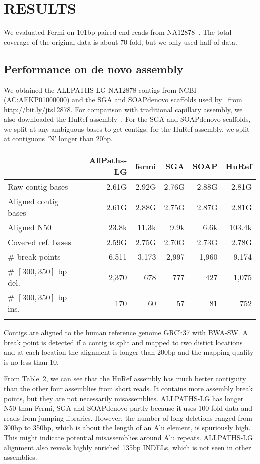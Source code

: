 \documentclass{bioinfo}
\begin{document}
\section{RESULTS}

We evaluated Fermi on 101bp paired-end reads from NA12878~\citep{Depristo:2011vn}.
The total coverage of the original data is about 70-fold, but we only used half
of data.

\subsection{Performance on de novo assembly}
We obtained the ALLPATHS-LG NA12878 contigs from NCBI (AC:AEKP01000000) and
the SGA and SOAPdenovo scaffolds used by~\citet{Simpson:2011ly} from
\mbox{http://bit.ly/jts12878}. For comparison with traditional capillary
assembly, we also downloaded the HuRef assembly~\citep{Levy:2007uq}. For the
SGA and SOAPdenovo scaffolds, we split at any ambiguous bases to get contigs;
for the HuRef assembly, we split at contiguous 'N' longer than 20bp.

\begin{table}[!htb]
{\begin{tabular}{lrrrrr}
\toprule
& AllPaths-LG & fermi & SGA & SOAP & HuRef \\
\midrule
Raw contig bases & 2.61G & 2.92G & 2.76G & 2.88G & 2.81G \\
Aligned contig bases & 2.61G & 2.88G & 2.75G & 2.87G & 2.81G \\
Aligned N50 & 23.8k & 11.3k & 9.9k & 6.6k & 103.4k \\
Covered ref. bases & 2.59G & 2.75G & 2.70G & 2.73G & 2.78G \\
\# break points & 6,511 & 3,173 & 2,997 & 1,960 & 9,174 \\
\# $[300,350]$ bp del. & 2,370 & 678 & 777 & 427 & 1,075 \\
\# $[300,350]$ bp ins. & 170 & 60 & 57 & 81 & 752 \\
\botrule
\end{tabular}}{Contigs are aligned to the human reference genome GRCh37 with
BWA-SW. A break point is detected if a contig is split and mapped to two
distict locations and at each location the alignment is longer than 200bp and
the mapping quality is no less than 10.}
\end{table}

From Table~2, we can see that the HuRef assembly has much better
contiguity than the other four assemblies from short reads. It contains more
assembly break points, but they are not necessarily misassemblies. ALLPATHS-LG
has longer N50 than Fermi, SGA and SOAPdenovo partly because it uses 100-fold
data and reads from jumping libraries. However, the number of long deletions
ranged from 300bp to 350bp, which is about the length of an Alu element, is
spuriously high. This might indicate potential misassemblies around Alu
repeats. ALLPATHS-LG alignment also reveals highly enriched 135bp INDELs, which
is not seen in other assemblies.
\end{document}
